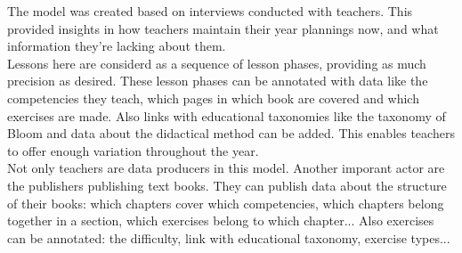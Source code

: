 The model was created based on interviews conducted with teachers. This provided insights in how teachers maintain their year plannings now, and what information they're lacking about them.\\
Lessons here are considerd as a sequence of lesson phases, providing as much precision as desired.
These lesson phases can be annotated with data like the competencies they teach, which pages in which book are covered and which exercises are made.
Also links with educational taxonomies like the taxonomy of Bloom and data about the didactical method can be added. This enables teachers to offer enough variation throughout the year.\\
Not only teachers are data producers in this model. Another imporant actor are the publishers publishing text books.
They can publish data about the structure of their books: which chapters cover which competencies, which chapters belong together in a section, which exercises belong to which chapter...
Also exercises can be annotated: the difficulty, link with educational taxonomy, exercise types...\\ \\
